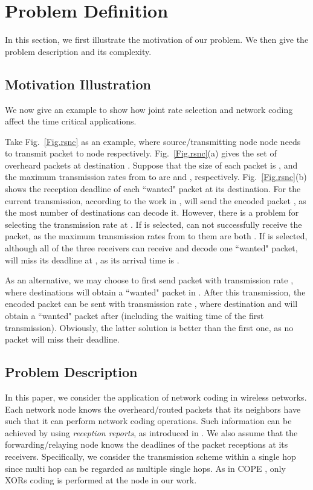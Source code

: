 \documentclass[journal]{IEEEtran}
\begin{document}
\section{Problem Definition}\label{Sec.formulation}
In this section, we first illustrate the motivation of our problem. We then give the problem description and its complexity.
\vspace{-0.24in}
\subsection{Motivation Illustration}\label{Sec.formulation.motivation}\vspace{-0.02in}
We now give an example to show how joint rate selection and network coding affect the time critical applications.

Take Fig.~\ref{Fig.rsnc} as an example, where source/transmitting node node  needs to transmit packet  to node 
respectively. Fig.~\ref{Fig.rsnc}(a) gives the set of overheard packets  at destination . Suppose that the size of each packet is , and the maximum transmission rates from  to  are  and , respectively.
Fig.~\ref{Fig.rsnc}(b) shows the reception deadline of each ``wanted" packet at its destination. For the current transmission, according to the work in \cite{KRH+2008XORs510,ZX2010Broadcast6},  will send the encoded packet , as the most number of destinations can decode it. However, there is a problem for selecting the transmission rate at . If  is selected,  can not successfully receive the packet, as the maximum transmission rates from  to them are both . If  is selected, although all of the three receivers  can receive and decode one ``wanted" packet,   will miss its deadline at , as its arrival time is .

As an alternative, we may choose to first send packet  with transmission rate , where destinations  will obtain a ``wanted" packet in . After this transmission, the encoded packet  can be sent with transmission rate , where destination  and  will obtain a ``wanted" packet after  (including the waiting time of the first transmission). Obviously, the latter solution is better than the first one, as no packet will miss their deadline.

\vspace{-0.15in}
\subsection{Problem Description}\vspace{-0.02in}
In this paper, we consider the application of network coding in wireless networks. Each network node knows the overheard/routed packets that its neighbors have such that it can perform network coding operations. Such information can be achieved by using {\em reception reports}, as introduced in \cite{KRH+2008XORs510}. We also assume that the forwarding/relaying node knows the deadlines of the packet receptions at its receivers. Specifically, we consider the transmission scheme within a single hop since multi hop can be regarded as multiple single hops. As in COPE \cite{KRH+2008XORs510}, only XORs coding is performed at the node in our work.
\end{document}
